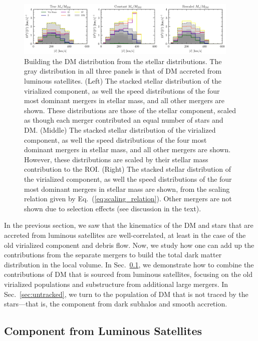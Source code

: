 \documentclass[twocolumn,preprintnumbers]{aastex6}
\DeclareRobustCommand{\Eq}[1]{Eq.~(\ref{#1})}
\begin{document}
\begin{figure}[tb] %
   \centering
	\includegraphics[width=0.95\textwidth]{plots/construct_dm_from_stars_m12i.pdf}
   \caption{Building the DM distribution from the stellar distributions. The gray distribution in all three panels is that of DM accreted from luminous satellites. (Left) The stacked stellar distribution of the virialized component, as well the speed distributions of the four most dominant mergers in stellar mass, and all other mergers are shown. These distributions are those of the stellar component, scaled as though each merger contributed an equal number of stars and DM. (Middle) The stacked stellar distribution of the virialized component, as well the speed distributions of the four most dominant mergers in stellar mass, and all other mergers are shown. However, these distributions are scaled by their stellar mass contribution to the ROI. (Right) The stacked stellar distribution of the virialized component, as well the speed distributions of the four most dominant mergers in stellar mass are shown, from the scaling relation given by \Eq{eq:scaling_relation}. Other mergers are not shown due to selection effects (see discussion in the text). }
   \label{fig:rescaling}
\end{figure}

In the previous section, we saw that the kinematics of the DM and stars that are accreted from luminous satellites are well-correlated, at least in the case of the old virialized component and debris flow.  Now, we study how one can add up the contributions from the separate mergers to build the total dark matter distribution in the local volume.  In Sec.~\ref{sec:luminous}, we demonstrate how to combine the contributions of DM that is sourced from luminous satellites, focusing on the old virialized populations and substructure from additional large mergers.  In Sec.~\ref{sec:untracked}, we turn to the population of DM that is not traced by the stars---that is, the component from dark subhalos and smooth accretion.

\subsection{Component from Luminous Satellites}
\label{sec:luminous}
\end{document}
